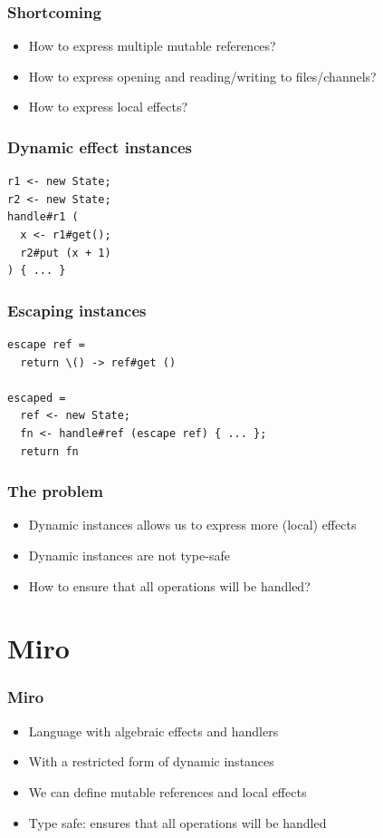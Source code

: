 \documentclass{beamer}
\begin{document}
\begin{frame}[fragile]\frametitle{Shortcoming}
\begin{itemize}
\item How to express multiple mutable references?
\item How to express opening and reading/writing to files/channels?
\item How to express local effects?
\end{itemize}
\end{frame}

\begin{frame}[fragile]\frametitle{Dynamic effect instances}
	\begin{example}
		\begin{verbatim}
r1 <- new State;
r2 <- new State;
handle#r1 (
  x <- r1#get();
  r2#put (x + 1)
) { ... }
		\end{verbatim}
	\end{example}
\end{frame}

\begin{frame}[fragile]\frametitle{Escaping instances}
	\begin{example}
		\begin{verbatim}
escape ref =
  return \() -> ref#get ()

escaped =
  ref <- new State;
  fn <- handle#ref (escape ref) { ... };
  return fn
		\end{verbatim}
	\end{example}
\end{frame}

\begin{frame}[fragile]\frametitle{The problem}
\begin{itemize}
\item Dynamic instances allows us to express more (local) effects
\item Dynamic instances are not type-safe
\item How to ensure that all operations will be handled?
\end{itemize}
\end{frame}

\section{Miro}

\begin{frame}[fragile]\frametitle{Miro}
\begin{itemize}
\item Language with algebraic effects and handlers
\item With a restricted form of dynamic instances
\item We can define mutable references and local effects
\item Type safe: ensures that all operations will be handled
\end{itemize}
\end{frame}
\end{document}
